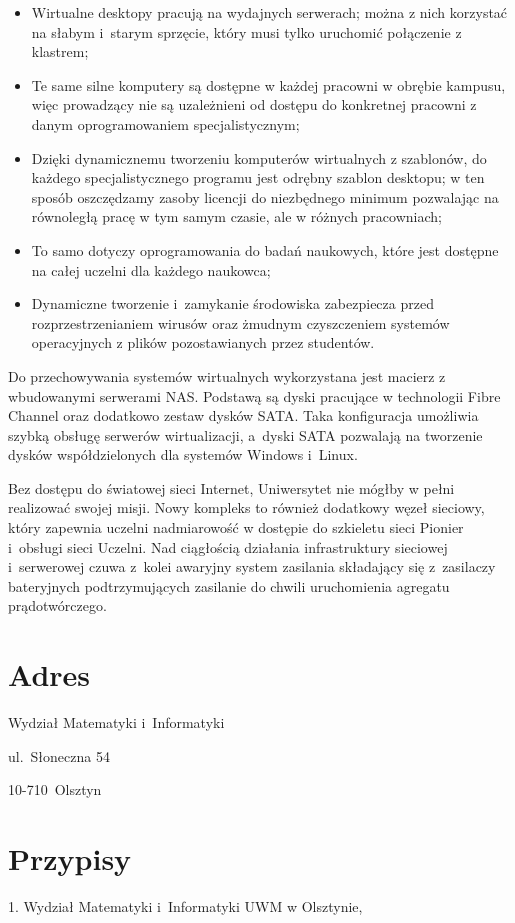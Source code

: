 \documentclass[a4paper,11pt]{article}
\begin{document}
\begin{itemize}
\begin{itemize}
\item Wirtualne desktopy pracują na wydajnych serwerach; można z nich korzystać na słabym i~starym
sprzęcie, który musi tylko uruchomić połączenie z klastrem;
\item Te same silne komputery są dostępne w każdej pracowni w obrębie kampusu, więc prowadzący nie są
uzależnieni od dostępu do konkretnej pracowni z danym oprogramowaniem specjalistycznym;
\item Dzięki dynamicznemu tworzeniu komputerów wirtualnych z szablonów, do każdego specjalistycznego
programu jest odrębny szablon desktopu; w ten sposób oszczędzamy zasoby licencji do niezbędnego
minimum pozwalając na równoległą pracę w tym samym czasie, ale w różnych pracowniach;
\item To samo dotyczy oprogramowania do badań naukowych, które jest dostępne na całej uczelni dla każdego
naukowca;
\item Dynamiczne tworzenie i~zamykanie środowiska zabezpiecza przed rozprzestrzenianiem wirusów oraz
żmudnym czyszczeniem systemów operacyjnych z plików pozostawianych przez studentów.
\end{itemize}

Do przechowywania systemów wirtualnych wykorzystana jest macierz z wbudowanymi serwerami NAS.
Podstawą są dyski pracujące w technologii Fibre Channel oraz dodatkowo zestaw dysków SATA. Taka
konfiguracja umożliwia szybką obsługę serwerów wirtualizacji, a~dyski SATA pozwalają na tworzenie dysków
współdzielonych dla systemów Windows i~Linux.

Bez dostępu do światowej sieci Internet, Uniwersytet nie mógłby w pełni realizować swojej misji. Nowy
kompleks to również dodatkowy węzeł sieciowy, który zapewnia uczelni nadmiarowość w dostępie do
szkieletu sieci Pionier i~obsługi sieci Uczelni. Nad ciągłością działania infrastruktury sieciowej i~serwerowej
czuwa z~kolei awaryjny system zasilania składający się z~zasilaczy bateryjnych podtrzymujących zasilanie do
chwili uruchomienia agregatu prądotwórczego.
\section{Adres} 
Wydział Matematyki i~Informatyki

ul.~Słoneczna 54

10-710~Olsztyn
\section{Przypisy} 
1. Wydział Matematyki i~Informatyki UWM w Olsztynie, 


\end{itemize}
\end{document}
